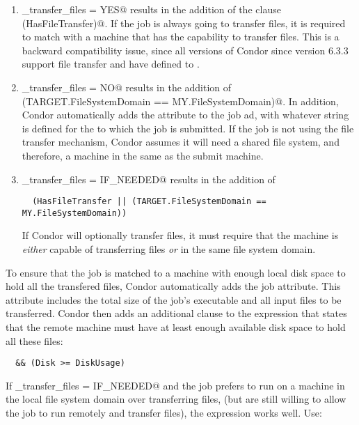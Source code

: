 \begin{enumerate}

\item 
\verb@should_transfer_files = YES@ results in the addition of
the clause \verb@(HasFileTransfer)@.
  If the job is always going to transfer files, it is required to 
  match with a machine that has the capability to transfer files.
  This is a backward compatibility issue, since all versions
  of Condor since version 6.3.3 support file transfer and have
   defined to \verb@TRUE@.

\item 
\verb@should_transfer_files = NO@ results in the addition of
  \verb@(TARGET.FileSystemDomain == MY.FileSystemDomain)@.
  In addition, Condor automatically adds the
   attribute to the job ad, with whatever
  string is defined for the  to which the job is
  submitted.
  If the job is not using the file transfer mechanism, Condor assumes
  it will need a shared file system, and therefore, a machine in the
  same  as the submit machine.

\item \verb@should_transfer_files = IF_NEEDED@ results in the addition of
\begin{verbatim}
  (HasFileTransfer || (TARGET.FileSystemDomain == MY.FileSystemDomain))
\end{verbatim}
  If Condor will optionally transfer files, it must require
  that the machine is \emph{either} capable of transferring files
  \emph{or} in the same file system domain.

\end{enumerate}

To ensure that the job is matched to a machine with enough local disk
space to hold all the transfered files, Condor automatically adds the
 job attribute.
This attribute includes the total
size of the job's executable and all input files to be transferred.
Condor then adds an additional clause to the 
expression that states that the remote machine must have at least
enough available disk space to hold all these files:
\begin{verbatim}
  && (Disk >= DiskUsage)
\end{verbatim}

If \verb@should_transfer_files = IF_NEEDED@ and the job prefers
to run on a machine in the local file system domain
over transferring files,
(but are still willing to allow the job to run remotely and transfer
files), the  expression works well.  Use:

